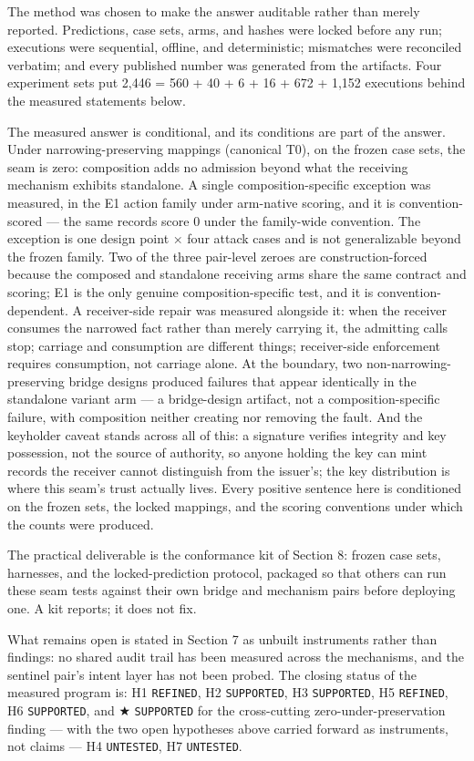 \documentclass[
  10pt,
]{article}
\let\origtexttt\texttt
\renewcommand{\texttt}[1]{{\upshape\origtexttt{#1}}}
\renewcommand{\_}{\origunderscore\allowbreak}
\begin{document}
The method was chosen to make the answer auditable rather than merely
reported. Predictions, case sets, arms, and hashes were locked before
any run; executions were sequential, offline, and deterministic;
mismatches were reconciled verbatim; and every published number was
generated from the artifacts. Four experiment sets put 2,446 = 560 + 40
+ 6 + 16 + 672 + 1,152 executions behind the measured statements below.

The measured answer is conditional, and its conditions are part of the
answer. Under narrowing-preserving mappings (canonical T0), on the
frozen case sets, the seam is zero: composition adds no admission beyond
what the receiving mechanism exhibits standalone. A single
composition-specific exception was measured, in the E1 action family
under arm-native scoring, and it is convention-scored --- the same
records score 0 under the family-wide convention. The exception is one
design point × four attack cases and is not generalizable beyond the
frozen family. Two of the three pair-level zeroes are
construction-forced because the composed and standalone receiving arms
share the same contract and scoring; E1 is the only genuine
composition-specific test, and it is convention-dependent. A
receiver-side repair was measured alongside it: when the receiver
consumes the narrowed fact rather than merely carrying it, the admitting
calls stop; carriage and consumption are different things; receiver-side
enforcement requires consumption, not carriage alone. At the boundary,
two non-narrowing-preserving bridge designs produced failures that
appear identically in the standalone variant arm --- a bridge-design
artifact, not a composition-specific failure, with composition neither
creating nor removing the fault. And the keyholder caveat stands across
all of this: a signature verifies integrity and key possession, not the
source of authority, so anyone holding the key can mint records the
receiver cannot distinguish from the issuer's; the key distribution is
where this seam's trust actually lives. Every positive sentence here is
conditioned on the frozen sets, the locked mappings, and the scoring
conventions under which the counts were produced.

The practical deliverable is the conformance kit of Section 8: frozen
case sets, harnesses, and the locked-prediction protocol, packaged so
that others can run these seam tests against their own bridge and
mechanism pairs before deploying one. A kit reports; it does not fix.

What remains open is stated in Section 7 as unbuilt instruments rather
than findings: no shared audit trail has been measured across the
mechanisms, and the sentinel pair's intent layer has not been probed.
The closing status of the measured program is: H1 \texttt{REFINED}, H2
\texttt{SUPPORTED}, H3 \texttt{SUPPORTED}, H5 \texttt{REFINED}, H6
\texttt{SUPPORTED}, and ★ \texttt{SUPPORTED} for the cross-cutting
zero-under-preservation finding --- with the two open hypotheses above
carried forward as instruments, not claims --- H4 \texttt{UNTESTED}, H7
\texttt{UNTESTED}.
\end{document}
